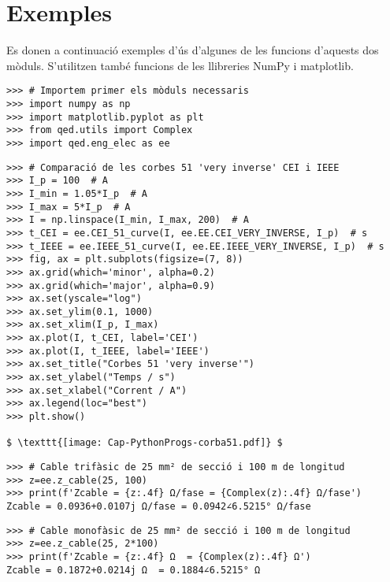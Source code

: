 


\section{Exemples}
Es donen a continuació  exemples d'ús d'algunes de les funcions d'aquests dos mòduls. S'utilitzen també funcions de les llibreries NumPy i  matplotlib.

\begin{lstlisting}
>>> # Importem primer els mòduls necessaris
>>> import numpy as np
>>> import matplotlib.pyplot as plt
>>> from qed.utils import Complex
>>> import qed.eng_elec as ee
\end{lstlisting} 

\begin{lstlisting}[mathescape=true]
>>> # Comparació de les corbes 51 'very inverse' CEI i IEEE
>>> I_p = 100  # A
>>> I_min = 1.05*I_p  # A
>>> I_max = 5*I_p  # A
>>> I = np.linspace(I_min, I_max, 200)  # A
>>> t_CEI = ee.CEI_51_curve(I, ee.EE.CEI_VERY_INVERSE, I_p)  # s   
>>> t_IEEE = ee.IEEE_51_curve(I, ee.EE.IEEE_VERY_INVERSE, I_p)  # s      
>>> fig, ax = plt.subplots(figsize=(7, 8))
>>> ax.grid(which='minor', alpha=0.2)
>>> ax.grid(which='major', alpha=0.9)
>>> ax.set(yscale="log")
>>> ax.set_ylim(0.1, 1000)
>>> ax.set_xlim(I_p, I_max)
>>> ax.plot(I, t_CEI, label='CEI')
>>> ax.plot(I, t_IEEE, label='IEEE')
>>> ax.set_title("Corbes 51 'very inverse'")
>>> ax.set_ylabel("Temps / s")
>>> ax.set_xlabel("Corrent / A")
>>> ax.legend(loc="best")
>>> plt.show()

$ \texttt{[image: Cap-PythonProgs-corba51.pdf]} $
\end{lstlisting}

\begin{lstlisting}
>>> # Cable trifàsic de 25 mm² de secció i 100 m de longitud
>>> z=ee.z_cable(25, 100)
>>> print(f'Zcable = {z:.4f} Ω/fase = {Complex(z):.4f} Ω/fase')
Zcable = 0.0936+0.0107j Ω/fase = 0.0942∠6.5215° Ω/fase	
\end{lstlisting} 

\begin{lstlisting}
>>> # Cable monofàsic de 25 mm² de secció i 100 m de longitud
>>> z=ee.z_cable(25, 2*100)
>>> print(f'Zcable = {z:.4f} Ω  = {Complex(z):.4f} Ω')
Zcable = 0.1872+0.0214j Ω  = 0.1884∠6.5215° Ω	
\end{lstlisting}

